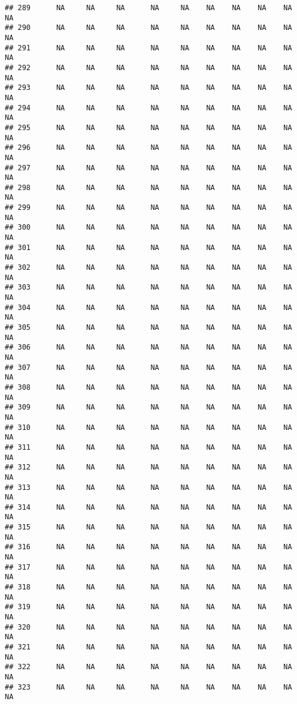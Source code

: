 \documentclass{article}\usepackage{graphicx, color}
\makeatletter
\newenvironment{kframe}{%
 \def\at@end@of@kframe{}%
 \ifinner\ifhmode%
  \def\at@end@of@kframe{\end{minipage}}%
  \begin{minipage}{\columnwidth}%
 \fi\fi%
 \def\FrameCommand##1{\hskip\@totalleftmargin \hskip-\fboxsep
 \colorbox{shadecolor}{##1}\hskip-\fboxsep
     \hskip-\linewidth \hskip-\@totalleftmargin \hskip\columnwidth}%
 \MakeFramed {\advance\hsize-\width
   \@totalleftmargin\z@ \linewidth\hsize
   \@setminipage}}%
 {\par\unskip\endMakeFramed%
 \at@end@of@kframe}
\newenvironment{knitrout}{}{} %
\makeatother
\begin{document}
\begin{knitrout}
\begin{kframe}
\begin{verbatim}
## 289      NA     NA     NA      NA     NA    NA    NA    NA    NA     NA
## 290      NA     NA     NA      NA     NA    NA    NA    NA    NA     NA
## 291      NA     NA     NA      NA     NA    NA    NA    NA    NA     NA
## 292      NA     NA     NA      NA     NA    NA    NA    NA    NA     NA
## 293      NA     NA     NA      NA     NA    NA    NA    NA    NA     NA
## 294      NA     NA     NA      NA     NA    NA    NA    NA    NA     NA
## 295      NA     NA     NA      NA     NA    NA    NA    NA    NA     NA
## 296      NA     NA     NA      NA     NA    NA    NA    NA    NA     NA
## 297      NA     NA     NA      NA     NA    NA    NA    NA    NA     NA
## 298      NA     NA     NA      NA     NA    NA    NA    NA    NA     NA
## 299      NA     NA     NA      NA     NA    NA    NA    NA    NA     NA
## 300      NA     NA     NA      NA     NA    NA    NA    NA    NA     NA
## 301      NA     NA     NA      NA     NA    NA    NA    NA    NA     NA
## 302      NA     NA     NA      NA     NA    NA    NA    NA    NA     NA
## 303      NA     NA     NA      NA     NA    NA    NA    NA    NA     NA
## 304      NA     NA     NA      NA     NA    NA    NA    NA    NA     NA
## 305      NA     NA     NA      NA     NA    NA    NA    NA    NA     NA
## 306      NA     NA     NA      NA     NA    NA    NA    NA    NA     NA
## 307      NA     NA     NA      NA     NA    NA    NA    NA    NA     NA
## 308      NA     NA     NA      NA     NA    NA    NA    NA    NA     NA
## 309      NA     NA     NA      NA     NA    NA    NA    NA    NA     NA
## 310      NA     NA     NA      NA     NA    NA    NA    NA    NA     NA
## 311      NA     NA     NA      NA     NA    NA    NA    NA    NA     NA
## 312      NA     NA     NA      NA     NA    NA    NA    NA    NA     NA
## 313      NA     NA     NA      NA     NA    NA    NA    NA    NA     NA
## 314      NA     NA     NA      NA     NA    NA    NA    NA    NA     NA
## 315      NA     NA     NA      NA     NA    NA    NA    NA    NA     NA
## 316      NA     NA     NA      NA     NA    NA    NA    NA    NA     NA
## 317      NA     NA     NA      NA     NA    NA    NA    NA    NA     NA
## 318      NA     NA     NA      NA     NA    NA    NA    NA    NA     NA
## 319      NA     NA     NA      NA     NA    NA    NA    NA    NA     NA
## 320      NA     NA     NA      NA     NA    NA    NA    NA    NA     NA
## 321      NA     NA     NA      NA     NA    NA    NA    NA    NA     NA
## 322      NA     NA     NA      NA     NA    NA    NA    NA    NA     NA
## 323      NA     NA     NA      NA     NA    NA    NA    NA    NA     NA

\end{verbatim}
\end{kframe}
\end{knitrout}
\end{document}
